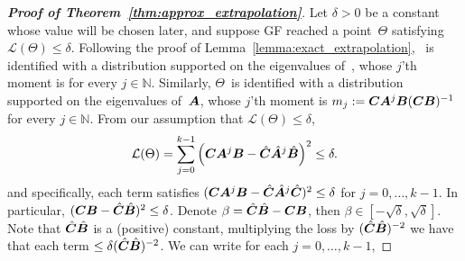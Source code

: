 \begin{proof}[\textbf{Proof of Theorem~\ref{thm:approx_extrapolation}}]

Let $\delta > 0$ be a constant whose value will be chosen later, and suppose GF reached a point~$\Theta$ satisfying $\mathcal{L} ( \Theta ) \leq \delta$.
Following the proof of Lemma~\ref{lemma:exact_extrapolation}, \smash{$\hat{\Theta}$}~is identified with a distribution supported on the eigenvalues of~\smash{$\hat{\mA}$}, whose $j$'th moment is  for every $j \in \mathbb{N}$.
Similarly, $\Theta$~is identified with a distribution supported on the eigenvalues of~${\bm{A}}$, whose $j$'th moment is $m_j := {\bm{C}} {\bm{A}}^j {\bm{B}} ( {\bm{C}} {\bm{B}} )^{-1}$ for every $j \in \mathbb{N}$. 
From our assumption that $\mathcal{L}(\Theta)\leq \delta$,
\begin{equation}\label{eq:loss_smaller_than_delta}
    \mathcal{L} (\Theta)=\sum_{j=0}^{k-1} \left( {\bm{C}}{\bm{A}}^j{\bm{B}} -\hat{{\bm{C}}}\hat{{\bm{A}}}^j\hat{{\bm{B}}}\right)^2\leq \delta.
\end{equation}
and specifically, each term satisfies $({\bm{C}}{\bm{A}}^j{\bm{B}}-\hat{{\bm{C}}}\hat{{\bm{A}}}^j\hat{{\bm{C}}})^2\le \delta$ for $j=0,\dots,k-1$. In particular, $({\bm{C}}{\bm{B}}-\hat{{\bm{C}}}\hat{{\bm{B}}})^2\le \delta$. Denote $\beta=\hat{{\bm{C}}}\hat{{\bm{B}}}-{\bm{C}}{\bm{B}}$, then $\beta\in[-\sqrt{\delta},\sqrt{\delta}]$. 
Note that $\hat{{\bm{C}}}\hat{{\bm{B}}}$ is a (positive) constant, multiplying the loss by $(\hat{{\bm{C}}}\hat{{\bm{B}}})^{-2}$ we have that each term $\leq\delta(\hat{{\bm{C}}}\hat{{\bm{B}}})^{-2}$. We can write for each $j=0,\dots,k-1$,


\end{proof}
